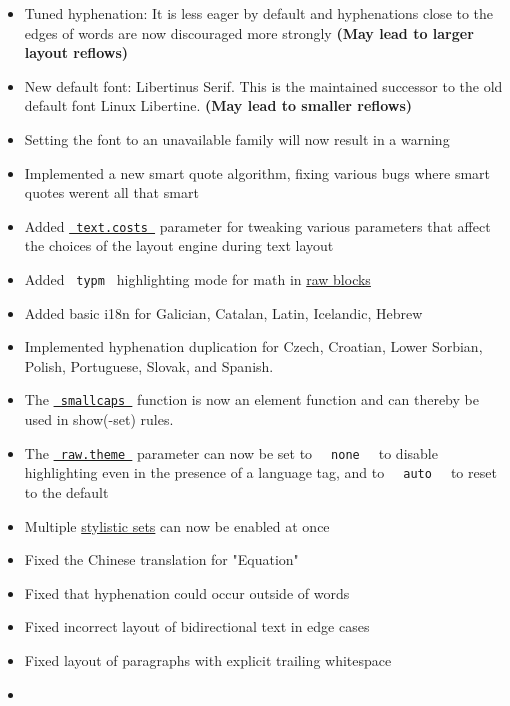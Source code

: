 \begin{itemize}
\tightlist
\item
  Tuned hyphenation: It is less eager by default and hyphenations close
  to the edges of words are now discouraged more strongly \textbf{(May
  lead to larger layout reflows)}
\item
  New default font: Libertinus Serif. This is the maintained successor
  to the old default font Linux Libertine. \textbf{(May lead to smaller
  reflows)}
\item
  Setting the font to an unavailable family will now result in a warning
\item
  Implemented a new smart quote algorithm, fixing various bugs where
  smart quotes weren\textquotesingle t all that smart
\item
  Added
  \href{/docs/reference/text/text/\#parameters-costs}{\texttt{\ text.costs\ }}
  parameter for tweaking various parameters that affect the choices of
  the layout engine during text layout
\item
  Added \texttt{\ typm\ } highlighting mode for math in
  \href{/docs/reference/text/raw/\#parameters-lang}{raw blocks}
\item
  Added basic i18n for Galician, Catalan, Latin, Icelandic, Hebrew
\item
  Implemented hyphenation duplication for Czech, Croatian, Lower
  Sorbian, Polish, Portuguese, Slovak, and Spanish.
\item
  The \href{/docs/reference/text/smallcaps/}{\texttt{\ smallcaps\ }}
  function is now an element function and can thereby be used in
  show(-set) rules.
\item
  The
  \href{/docs/reference/text/raw/\#parameters-theme}{\texttt{\ raw.theme\ }}
  parameter can now be set to \texttt{\ }{\texttt{\ none\ }}\texttt{\ }
  to disable highlighting even in the presence of a language tag, and to
  \texttt{\ }{\texttt{\ auto\ }}\texttt{\ } to reset to the default
\item
  Multiple
  \href{/docs/reference/text/text/\#parameters-stylistic-set}{stylistic
  sets} can now be enabled at once
\item
  Fixed the Chinese translation for "Equation"
\item
  Fixed that hyphenation could occur outside of words
\item
  Fixed incorrect layout of bidirectional text in edge cases
\item
  Fixed layout of paragraphs with explicit trailing whitespace
\item

\end{itemize}
